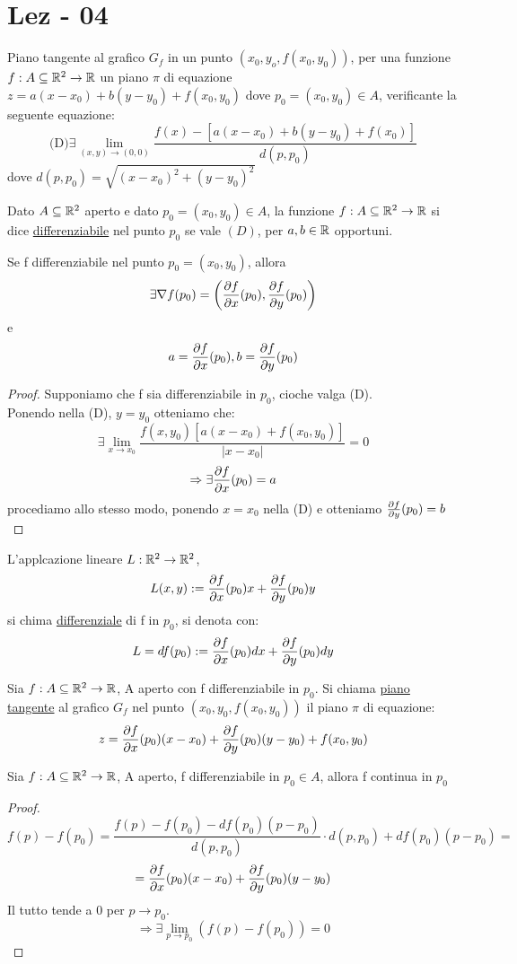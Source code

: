 \section{Lez - 04}
Piano tangente al grafico $G_f$ in un punto $\left(x_0,y_o,f(x_0,y_0)\right)$, per una funzione $f: A \subseteq \mathbb{R}^2 \to \mathbb{R}$ \ace un piano 
$\pi$ di equazione $z=a(x-x_0)+b(y-y_0)+f(x_0,y_0)$ dove $p_0 = (x_0,y_0)\in A$, verificante la seguente equazione:
$$\text{(D)} \exists \lim_{(x,y)\to (0,0)}\frac{f(x)-\left[a(x-x_0)+b(y-y_0)+f(x_0)\right]}{d(p,p_0)}$$
dove $d(p,p_0) = \sqrt{(x-x_0)^2+(y-y_0)^2}$
\begin{definition}
  Dato $A \subseteq \mathbb{R}^2$ aperto e dato $p_0=(x_0,y_0)\in A$, la funzione $f: A \subseteq \mathbb{R}^2 \to \mathbb{R}$ si dice \underline{differenziabile}
  nel punto $p_0$ se vale $(D)$, per $a,b \in \mathbb{R}$ opportuni.
\end{definition}
\begin{proposition}
  Se f \ace differenziabile nel punto $p_0 =(x_0,y_0)$, allora $$\exists\nabla f(p_0) = \left(\frac{\partial f}{\partial x}(p_0), \frac{\partial f}{\partial y}(p_0)\right)$$
  e $$a = \frac{\partial f}{\partial x}(p_0) , b =\frac{\partial f}{\partial y}(p_0) $$
  \begin{proof}
    Supponiamo che f sia differenziabile in $p_0$, cio\ace che valga (D). \\
    Ponendo nella (D), $y = y_0$ otteniamo che:
    $$\exists \lim_{x\to x_0} \frac{f(x,y_0) \left[a(x-x_0)+f(x_0,y_0)\right]}{\lvert x -x_0\rvert} = 0$$
    $$\Rightarrow \exists\frac{\partial f}{\partial x}(p_0) = a$$
    procediamo allo stesso modo, ponendo $x=x_0$ nella (D) e otteniamo $\frac{\partial f}{\partial y}(p_0) = b$
  \end{proof}
\end{proposition}
\begin{definition}
  L'applcazione lineare $L:\mathbb{R}^2\to\mathbb{R}^2$, $$L(x,y) := \frac{\partial f}{\partial x}(p_0) x + \frac{\partial f}{\partial y}(p_0) y$$ si chima \underline{differenziale} di f in $p_0$, si denota
  con: $$L = df(p_0) := \frac{\partial f}{\partial x}(p_0) dx + \frac{\partial f}{\partial y}(p_0) dy$$
\end{definition}
\begin{definition}
  Sia $f: A \subseteq \mathbb{R}^2 \to \mathbb{R}$, A aperto con f differenziabile in $p_0$. Si chiama \underline{piano tangente} al grafico $G_f$ nel 
  punto $(x_0,y_0,f(x_0,y_0))$ il piano $\pi$ di equazione:
  $$z = \frac{\partial f}{\partial x}(p_0) (x-x_0) + \frac{\partial f}{\partial y}(p_0) (y-y_0) + f(x_0,y_0)$$
\end{definition}
\begin{theorem}
  Sia $f: A \subseteq \mathbb{R}^2 \to \mathbb{R}$, A aperto, f differenziabile in $p_0 \in A$, allora f \ace continua in $p_0$
  \begin{proof}
    $$f(p)-f(p_0) = \frac{f(p)-f(p_0)-df(p_0)(p-p_0)}{d(p,p_0)} \cdot d(p,p_0) + df(p_0)(p-p_0) = $$
    $$= \frac{\partial f}{\partial x}(p_0) (x-x_0) + \frac{\partial f}{\partial y}(p_0) (y-y_0)$$
    Il tutto tende a 0 per $p\to p_0$.\\
    $$\Rightarrow \exists \lim_{p\to p_0} \left(f(p)-f(p_0)\right) = 0$$
  \end{proof}
\end{theorem}
